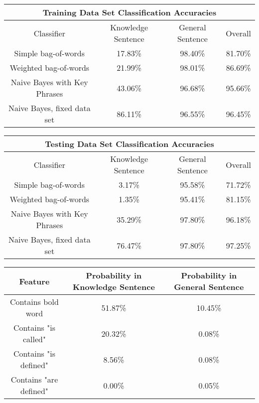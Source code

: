 \documentclass{article} %
\begin{document}
\begin{center}
 \label{tab:title} 
\begin{tabular}{ |c||c|c|c| }
	\hline
	\multicolumn{4}{|c|}{Training Data Set Classification Accuracies} \\
	\hline
	Classifier & Knowledge Sentence & General Sentence & Overall \\
	\hline
	Simple bag-of-words & 17.83\% & 98.40\% & 81.70\% \\
	Weighted bag-of-words & 21.99\% & 98.01\% & 86.69\% \\
	Naive Bayes with Key Phrases & 43.06\% & 96.68\% & 95.66\% \\
	Naive Bayes, fixed data set & 86.11\% & 96.55\% & 96.45\% \\
	\hline
\end{tabular}

 \label{tab:title2} 
\begin{tabular}{ |c||c|c|c| }
	\hline
	\multicolumn{4}{|c|}{Testing Data Set Classification Accuracies} \\
	\hline
	Classifier & Knowledge Sentence & General Sentence & Overall \\
	\hline
	Simple bag-of-words & 3.17\% & 95.58\% & 71.72\% \\
	Weighted bag-of-words & 1.35\% & 95.41\% & 81.15\% \\
	Naive Bayes with Key Phrases & 35.29\% & 97.80\% & 96.18\% \\
	Naive Bayes, fixed data set & 76.47\% & 97.80\% & 97.25\% \\
	\hline
\end{tabular}

 \label{tab:title} 
\begin{tabular}{ |c||c|c| }
	\hline
	Feature & Probability in Knowledge Sentence & Probability in General Sentence \\
	\hline
	Contains bold word & 51.87\% & 10.45\% \\
	Contains "is called" & 20.32\% & 0.08\% \\
	Contains "is defined" & 8.56\% & 0.08\% \\
	Contains "are defined" & 0.00\% & 0.05\% \\
	\hline
\end{tabular}
\end{center}
\end{document}
